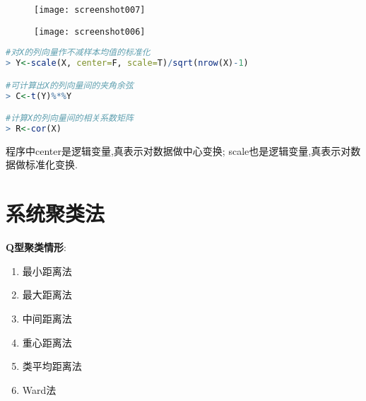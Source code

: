 \documentclass[11pt,a4paper,oneside]{book}
\begin{document}
\begin{figure}[H]
	\texttt{[image: screenshot007]}
\end{figure}
\begin{figure}[H]
	\texttt{[image: screenshot006]}
\end{figure}

\begin{lstlisting}[language=r]
#对X的列向量作不减样本均值的标准化
> Y<-scale(X, center=F, scale=T)/sqrt(nrow(X)-1)

#可计算出X的列向量间的夹角余弦
> C<-t(Y)%*%Y

#计算X的列向量间的相关系数矩阵
> R<-cor(X)
\end{lstlisting}
程序中center是逻辑变量,真表示对数据做中心变换; scale也是逻辑变量,真表示对数据做标准化变换.
\section{系统聚类法}
\textbf{Q型聚类情形}:
\begin{enumerate}
	\item 最小距离法
	\item 最大距离法
	\item 中间距离法
	\item 重心距离法
	\item 类平均距离法
	\item Ward法
\end{enumerate}
\end{document}
